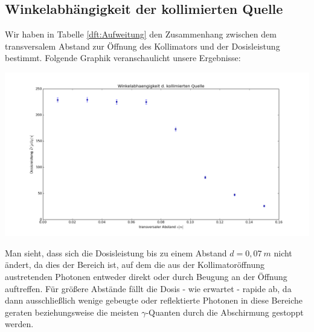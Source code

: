 \subsection{Winkelabhängigkeit der kollimierten Quelle}
Wir haben in Tabelle \ref{dft:Aufweitung} den Zusammenhang zwischen dem transversalem Abstand zur Öffnung des Kollimators und der Dosisleistung bestimmt. Folgende Graphik veranschaulicht unsere Ergebnisse:
\begin{center}
    \minipanf      
        	 \includegraphics[width=1.2\linewidth,
        	 height=0.4\textheight]{pic/winkelabhaengigkeit}
        \label{fig:Aufweitung}
    \minipend
    \vspace{5mm}
\end{center}
Man sieht, dass sich die Dosisleistung bis zu einem Abstand $d=0,07\ \unit{m}$ nicht ändert, da dies der Bereich ist, auf dem die aus der Kollimatoröffnung austretenden Photonen entweder direkt oder durch Beugung an der Öffnung auftreffen. Für größere Abstände fällt die Dosis - wie erwartet - rapide ab, da dann ausschließlich wenige gebeugte oder reflektierte Photonen in diese Bereiche geraten beziehungsweise die meisten $\gamma$-Quanten durch die Abschirmung gestoppt werden.
